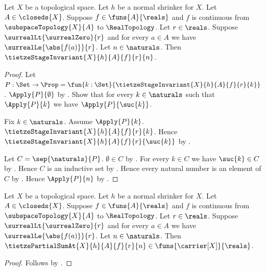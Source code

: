 \begin{theorem}\label{tietze_stage_invariant}
    Let $X$ be a topological space.
    Let $h$ be a normal shrinker for $X$.
    Let $A\in\closeds{X}$.
    Suppose $f\in\funs{A}{\reals}$ and
        $f$ is continuous from $\subspaceTopology{X}{A}$ to
            $\RealTopology$.
    Let $r\in\reals$.
    Suppose $\surrealLt{\surrealZero}{r}$ and
        for every $a\in A$ we have $\surrealLe{\abs{f(a)}}{r}$.
    Let $n\in\naturals$.
    Then $\tietzeStageInvariant{X}{h}{A}{f}{r}{n}$.
\end{theorem}
\begin{proof}
    Let $P:\Set\to\Prop=\fun{k:\Set}{
        \tietzeStageInvariant{X}{h}{A}{f}{r}{k}}$.
    $\Apply{P}{\emptyset}$ by .
    Show that for every $k\in\naturals$ such that $\Apply{P}{k}$
        we have $\Apply{P}{\suc{k}}$.
    \begin{subproof}
        Fix $k\in\naturals$.
        Assume $\Apply{P}{k}$.
        $\tietzeStageInvariant{X}{h}{A}{f}{r}{k}$.
        Hence $\tietzeStageInvariant{X}{h}{A}{f}{r}{\suc{k}}$
            by .
    \end{subproof}
    Let $C=\sep{\naturals}{P}$.
    $\emptyset\in C$ by .
    For every $k\in C$ we have $\suc{k}\in C$
        by .
    Hence $C$ is an inductive set by .
    Hence every natural number is an element of $C$
        by .
    Hence $\Apply{P}{n}$ by .
\end{proof}

\begin{corollary}\label{tietze_partial_sum_typed}
    Let $X$ be a topological space.
    Let $h$ be a normal shrinker for $X$.
    Let $A\in\closeds{X}$.
    Suppose $f\in\funs{A}{\reals}$ and $f$ is continuous from
        $\subspaceTopology{X}{A}$ to $\RealTopology$.
    Let $r\in\reals$.
    Suppose $\surrealLt{\surrealZero}{r}$ and
        for every $a\in A$ we have $\surrealLe{\abs{f(a)}}{r}$.
    Let $n\in\naturals$.
    Then $\tietzePartialSumAt{X}{h}{A}{f}{r}{n}
        \in\funs{\carrier[X]}{\reals}$.
\end{corollary}
\begin{proof}
    Follows by
        .
\end{proof}

